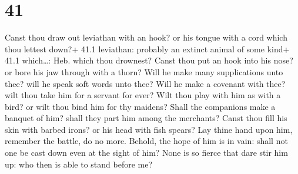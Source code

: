 \hypertarget{section-40}{%
\section{41}\label{section-40}}

 Canst thou draw out leviathan with an hook? or his tongue
with a cord which thou lettest down?+ 41.1 leviathan: probably an
extinct animal of some kind+ 41.1 which\ldots: Heb. which thou drownest?
 Canst thou put an hook into his nose? or bore his jaw
through with a thorn?  Will he make many supplications unto
thee? will he speak soft words unto thee?  Will he make a
covenant with thee? wilt thou take him for a servant for ever?
 Wilt thou play with him as with a bird? or wilt thou bind
him for thy maidens?  Shall the companions make a banquet of
him? shall they part him among the merchants?  Canst thou
fill his skin with barbed irons? or his head with fish spears?
 Lay thine hand upon him, remember the battle, do no more.
 Behold, the hope of him is in vain: shall not one be cast
down even at the sight of him?  None is so fierce that dare
stir him up: who then is able to stand before me?

